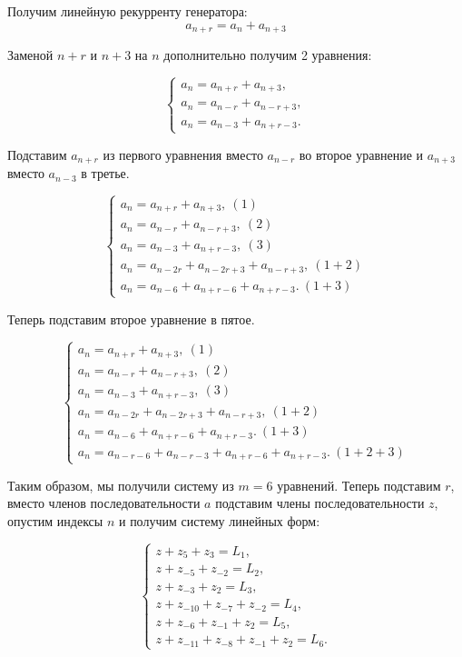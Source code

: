 \documentclass[letterpaper,11pt,openany]{book}
\begin{document}
Получим линейную рекурренту генератора:
$$a_{n+r} = a_n + a_{n+3}$$

Заменой $n+r$ и $n+3$ на $n$ дополнительно получим 2 уравнения:

\begin{equation*}
\begin{cases}
a_n = a_{n+r} + a_{n+3}, \\
a_n = a_{n-r} + a_{n-r+3}, \\
a_n = a_{n-3} + a_{n+r-3}.
\end{cases}
\end{equation*}

Подставим $a_{n+r}$ из первого уравнения вместо $a_{n-r}$ во второе уравнение и $a_{n+3}$ вместо $a_{n-3}$ в третье.

\begin{equation*}
\begin{cases}
a_n = a_{n+r} + a_{n+3},\ (1) \\
a_n = a_{n-r} + a_{n-r+3},\ (2) \\
a_n = a_{n-3} + a_{n+r-3},\ (3) \\
a_n = a_{n-2r} + a_{n-2r+3} + a_{n-r+3},\ (1+2) \\
a_n = a_{n-6} + a_{n+r-6} + a_{n+r-3}.\ (1+3)
\end{cases}
\end{equation*}

Теперь подставим второе уравнение в пятое.

\begin{equation*}
\begin{cases}
a_n = a_{n+r} + a_{n+3},\ (1) \\
a_n = a_{n-r} + a_{n-r+3},\ (2) \\
a_n = a_{n-3} + a_{n+r-3},\ (3) \\
a_n = a_{n-2r} + a_{n-2r+3} + a_{n-r+3},\ (1+2) \\
a_n = a_{n-6} + a_{n+r-6} + a_{n+r-3}.\ (1+3) \\
a_n = a_{n-r-6} + a_{n-r-3} + a_{n+r-6} + a_{n+r-3}.\ (1+2+3)
\end{cases}
\end{equation*}

Таким образом, мы получили систему из $m=6$ уравнений. Теперь подставим $r$, вместо членов последовательности $a$ подставим члены последовательности $z$, опустим индексы $n$ и получим систему линейных форм:

\begin{equation*}
\begin{cases}
z + z_{5} + z_{3} = L_1, \\
z + z_{-5} + z_{-2} = L_2, \\
z + z_{-3} + z_{2} = L_3, \\
z + z_{-10} + z_{-7} + z_{-2} = L_4, \\
z + z_{-6} + z_{-1} + z_{2} = L_5, \\
z + z_{-11} + z_{-8} + z_{-1} + z_{2} = L_6.
\end{cases}
\end{equation*}
\end{document}
